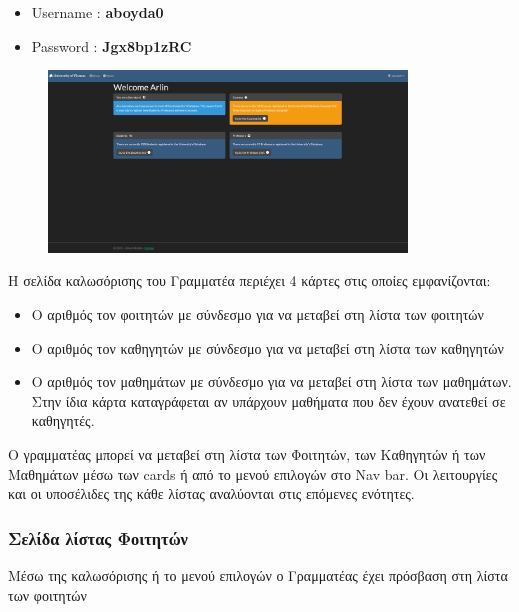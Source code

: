 \documentclass[12pt]{article}
\begin{document}
	\begin{itemize}
		\item Username : \textbf{aboyda0}
		\item Password : \textbf{Jgx8bp1zRC}
	\end{itemize}


	\begin{figure}[H]
	\centering
	\includegraphics[width=0.85\textwidth]{secs.png}
	\caption{}
	\label{fig:emptyView}
	\end{figure}

	Η σελίδα καλωσόρισης του Γραμματέα περιέχει 4 κάρτες στις οποίες εμφανίζονται:
	
	\begin{itemize}
		
		\item Ο αριθμός τον φοιτητών με σύνδεσμο για να μεταβεί στη λίστα των φοιτητών
		
		\item Ο αριθμός τον καθηγητών με σύνδεσμο για να μεταβεί στη λίστα των καθηγητών
		
		\item Ο αριθμός τον μαθημάτων με σύνδεσμο για να μεταβεί στη λίστα των μαθημάτων. Στην ίδια κάρτα καταγράφεται αν υπάρχουν μαθήματα που δεν έχουν ανατεθεί σε καθηγητές.
		
	\end{itemize}

	Ο γραμματέας μπορεί να μεταβεί στη λίστα των Φοιτητών, των Καθηγητών ή των Μαθημάτων μέσω των cards ή από το μενού επιλογών στο Nav bar. Οι λειτουργίες και οι υποσέλιδες της κάθε λίστας αναλύονται στις επόμενες ενότητες.
	
	\newpage
	\subsubsection{Σελίδα λίστας Φοιτητών}

	Μέσω της καλωσόρισης ή το μενού επιλογών ο Γραμματέας έχει πρόσβαση στη λίστα των φοιτητών
\end{document}
